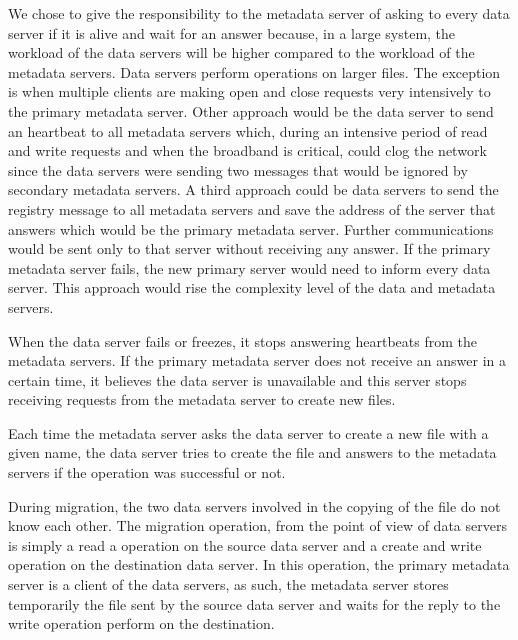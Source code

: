 We chose to give the responsibility to the metadata server of asking to
every data server if it is alive and wait for an answer because, in a large
system, the workload of the data servers will be higher compared to the
workload of the metadata servers. Data servers perform operations on larger
files. The exception is when multiple clients are making open and close
requests very intensively to the primary metadata server. Other approach
would be the data server to send an heartbeat to all metadata servers which,
during an intensive period of read and write requests and when the broadband
is critical, could clog the network since the data servers were sending two
messages that would be ignored by secondary metadata servers.
A third approach could be data servers to send the registry message to all
metadata servers and save the address of the server that answers which 
would be the primary metadata server. Further communications would be sent 
only to that server without receiving any answer. If the primary
metadata server fails, the new primary server would need to inform every data
server. This approach would rise the complexity level of the data and
metadata servers.

When the data server fails or freezes, it stops answering heartbeats from
the metadata servers. If the primary metadata server does not receive an
answer in a certain time, it believes the data server is unavailable
and this server stops receiving requests from the metadata server to
create new files.

Each time the metadata server asks the data server to create a new file
with a given name, the data server tries to create the file and answers
to the metadata servers if the operation was successful or not.

During migration, the two data servers involved in the copying of the file
do not know each other. The migration operation, from the point of view of data
servers is simply a read a operation on the source data server and a create and
write operation on the destination data server. In this operation, the primary
metadata server is a client of the data servers, as such, the metadata server
stores temporarily the file sent by the source data server and waits for the
reply to the write operation perform on the destination.


